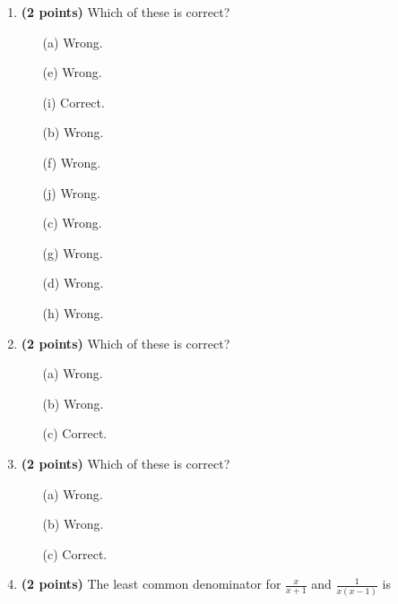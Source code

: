 \documentclass[12pt]{amsart}
\begin{document}
\newpage
\begin{enumerate}
\item {\bf (2 points)} 
 Which of these is correct?

\begin{minipage}[t]{1.0\linewidth}\begin{multicols}{4}\begin{itemize}\item[(a)]  Wrong. \item[(e)]  Wrong. \item[(i)]  Correct. \item[(b)]  Wrong. \item[(f)]  Wrong. \item[(j)]  Wrong. \item[(c)]  Wrong. \item[(g)]  Wrong. \item[] \item[(d)]  Wrong. \item[(h)]  Wrong. \item[] \end{itemize}\end{multicols}\end{minipage} \vfill 
\item {\bf (2 points)} 
 Which of these is correct?

\begin{minipage}[t]{1.0\linewidth}\begin{multicols}{3}\begin{itemize}\item[(a)]  Wrong. \item[(b)]  Wrong. \item[(c)]  Correct. \end{itemize}\end{multicols}\end{minipage} \vfill 
\item {\bf (2 points)} 
 Which of these is correct?

\begin{minipage}[t]{1.0\linewidth}\begin{multicols}{3}\begin{itemize}\item[(a)]  Wrong. \item[(b)]  Wrong. \item[(c)]  Correct. \end{itemize}\end{multicols}\end{minipage} \vfill 
\item {\bf (2 points)} 
 The least common denominator for $\displaystyle \frac{x}{x+1}$ and $\displaystyle \frac{1}{x(x-1)}$ is \vspace{.2cm}


\end{enumerate}
\end{document}
